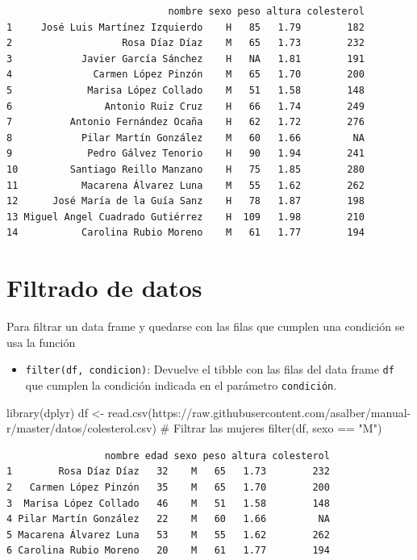 \documentclass[
  a4paper,
]{scrreport}
\newenvironment{Shaded}{\begin{snugshade}}{\end{snugshade}}
\newcommand{\CommentTok}[1]{\textcolor[rgb]{0.37,0.37,0.37}{#1}}
\newcommand{\FunctionTok}[1]{\textcolor[rgb]{0.28,0.35,0.67}{#1}}
\newcommand{\NormalTok}[1]{\textcolor[rgb]{0.00,0.23,0.31}{#1}}
\newcommand{\OtherTok}[1]{\textcolor[rgb]{0.00,0.23,0.31}{#1}}
\newcommand{\SpecialCharTok}[1]{\textcolor[rgb]{0.37,0.37,0.37}{#1}}
\newcommand{\StringTok}[1]{\textcolor[rgb]{0.13,0.47,0.30}{#1}}
\providecommand{\tightlist}{%
  \setlength{\itemsep}{0pt}\setlength{\parskip}{0pt}}\usepackage{longtable,booktabs,array}
\theoremstyle{definition}
\theoremstyle{definition}
\theoremstyle{remark}
\begin{document}
\begin{verbatim}
                            nombre sexo peso altura colesterol
1     José Luis Martínez Izquierdo    H   85   1.79        182
2                   Rosa Díaz Díaz    M   65   1.73        232
3            Javier García Sánchez    H   NA   1.81        191
4              Carmen López Pinzón    M   65   1.70        200
5             Marisa López Collado    M   51   1.58        148
6                Antonio Ruiz Cruz    H   66   1.74        249
7          Antonio Fernández Ocaña    H   62   1.72        276
8            Pilar Martín González    M   60   1.66         NA
9             Pedro Gálvez Tenorio    H   90   1.94        241
10         Santiago Reillo Manzano    H   75   1.85        280
11           Macarena Álvarez Luna    M   55   1.62        262
12      José María de la Guía Sanz    H   78   1.87        198
13 Miguel Angel Cuadrado Gutiérrez    H  109   1.98        210
14           Carolina Rubio Moreno    M   61   1.77        194
\end{verbatim}

\hypertarget{filtrado-de-datos}{%
\section{Filtrado de datos}\label{filtrado-de-datos}}

Para filtrar un data frame y quedarse con las filas que cumplen una
condición se usa la función

\begin{itemize}
\tightlist
\item
  \texttt{filter(df,\ condicion)}: Devuelve el tibble con las filas del
  data frame \texttt{df} que cumplen la condición indicada en el
  parámetro \texttt{condición}.
\end{itemize}

\begin{Shaded}
\begin{Highlighting}[]
\FunctionTok{library}\NormalTok{(dplyr)}
\NormalTok{df }\OtherTok{\textless{}{-}} \FunctionTok{read.csv}\NormalTok{(}\StringTok{\textquotesingle{}https://raw.githubusercontent.com/asalber/manual{-}r/master/datos/colesterol.csv\textquotesingle{}}\NormalTok{)}
\CommentTok{\# Filtrar las mujeres}
\FunctionTok{filter}\NormalTok{(df, sexo }\SpecialCharTok{==} \StringTok{"M"}\NormalTok{)}
\end{Highlighting}
\end{Shaded}

\begin{verbatim}
                 nombre edad sexo peso altura colesterol
1        Rosa Díaz Díaz   32    M   65   1.73        232
2   Carmen López Pinzón   35    M   65   1.70        200
3  Marisa López Collado   46    M   51   1.58        148
4 Pilar Martín González   22    M   60   1.66         NA
5 Macarena Álvarez Luna   53    M   55   1.62        262
6 Carolina Rubio Moreno   20    M   61   1.77        194
\end{verbatim}
\end{document}
